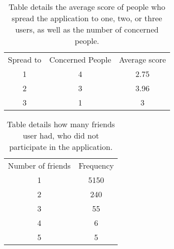 \documentclass[preprint,12pt]{elsarticle}
\begin{document}
\begin{table}
\label{tab:scorespread}
\begin{tabular}{c c c}
Spread to & Concerned People & Average score \\ 
1&	4 & 2.75 \\
2&	3&3.96 \\
3&	1&3 \\
\end{tabular}
\caption{Table details the average score of people who spread the
  application to one, two, or three users, as well as the number of
  concerned people.}
\end{table}

\begin{table}
\label{tab:nouser}
\begin{tabular}{c c}
Number of friends & Frequency \\
1& 5150\\
2& 240\\
3& 55\\
4& 6\\
5& 5\\
\end{tabular}
\caption{Table details how many friends user had, who did not
  participate in the application.}
\end{table}
\end{document}
